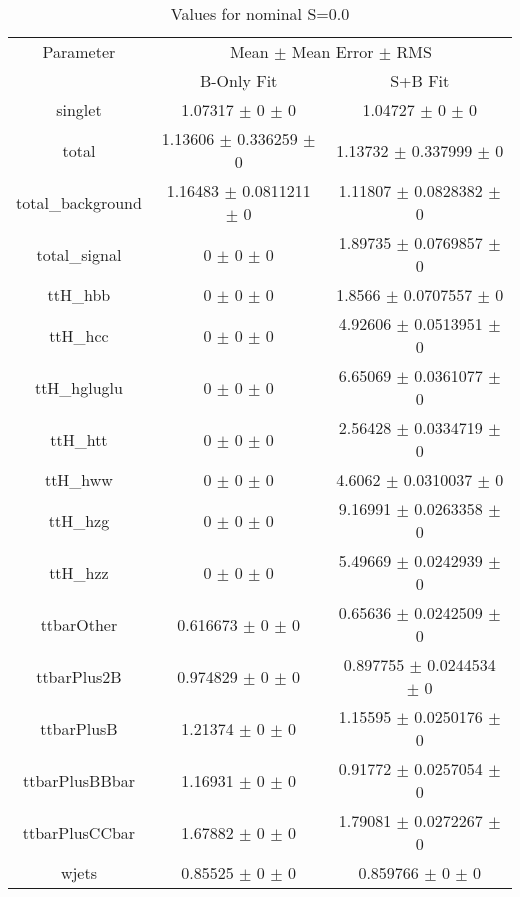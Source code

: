 \begin{table}
\centering
\caption{Values for nominal S=0.0}
\begin{tabular}{ccc}
\toprule
Parameter & \multicolumn{2}{c}{Mean $\pm$ Mean Error $\pm$ RMS}\\
 & B-Only Fit & S+B Fit\\
\midrule
singlet & \num{1.07317} $\pm$ \num{0} $\pm$ \num{0} & \num{1.04727} $\pm$ \num{0} $\pm$ \num{0}\\
total & \num{1.13606} $\pm$ \num{0.336259} $\pm$ \num{0} & \num{1.13732} $\pm$ \num{0.337999} $\pm$ \num{0}\\
total\_background & \num{1.16483} $\pm$ \num{0.0811211} $\pm$ \num{0} & \num{1.11807} $\pm$ \num{0.0828382} $\pm$ \num{0}\\
total\_signal & \num{0} $\pm$ \num{0} $\pm$ \num{0} & \num{1.89735} $\pm$ \num{0.0769857} $\pm$ \num{0}\\
ttH\_hbb & \num{0} $\pm$ \num{0} $\pm$ \num{0} & \num{1.8566} $\pm$ \num{0.0707557} $\pm$ \num{0}\\
ttH\_hcc & \num{0} $\pm$ \num{0} $\pm$ \num{0} & \num{4.92606} $\pm$ \num{0.0513951} $\pm$ \num{0}\\
ttH\_hgluglu & \num{0} $\pm$ \num{0} $\pm$ \num{0} & \num{6.65069} $\pm$ \num{0.0361077} $\pm$ \num{0}\\
ttH\_htt & \num{0} $\pm$ \num{0} $\pm$ \num{0} & \num{2.56428} $\pm$ \num{0.0334719} $\pm$ \num{0}\\
ttH\_hww & \num{0} $\pm$ \num{0} $\pm$ \num{0} & \num{4.6062} $\pm$ \num{0.0310037} $\pm$ \num{0}\\
ttH\_hzg & \num{0} $\pm$ \num{0} $\pm$ \num{0} & \num{9.16991} $\pm$ \num{0.0263358} $\pm$ \num{0}\\
ttH\_hzz & \num{0} $\pm$ \num{0} $\pm$ \num{0} & \num{5.49669} $\pm$ \num{0.0242939} $\pm$ \num{0}\\
ttbarOther & \num{0.616673} $\pm$ \num{0} $\pm$ \num{0} & \num{0.65636} $\pm$ \num{0.0242509} $\pm$ \num{0}\\
ttbarPlus2B & \num{0.974829} $\pm$ \num{0} $\pm$ \num{0} & \num{0.897755} $\pm$ \num{0.0244534} $\pm$ \num{0}\\
ttbarPlusB & \num{1.21374} $\pm$ \num{0} $\pm$ \num{0} & \num{1.15595} $\pm$ \num{0.0250176} $\pm$ \num{0}\\
ttbarPlusBBbar & \num{1.16931} $\pm$ \num{0} $\pm$ \num{0} & \num{0.91772} $\pm$ \num{0.0257054} $\pm$ \num{0}\\
ttbarPlusCCbar & \num{1.67882} $\pm$ \num{0} $\pm$ \num{0} & \num{1.79081} $\pm$ \num{0.0272267} $\pm$ \num{0}\\
wjets & \num{0.85525} $\pm$ \num{0} $\pm$ \num{0} & \num{0.859766} $\pm$ \num{0} $\pm$ \num{0}\\
\bottomrule
\end{tabular}
\end{table}
